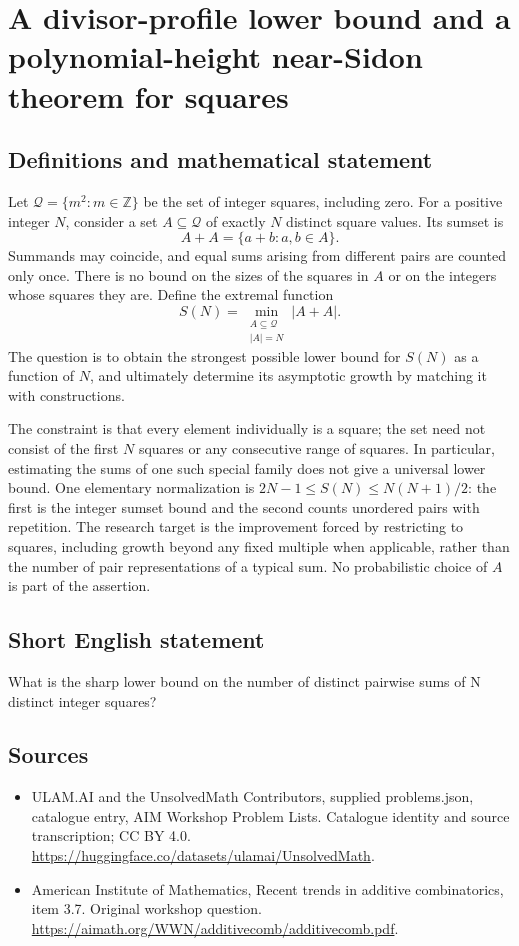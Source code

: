 \documentclass[11pt,a4paper]{article}
\begin{document}
\section*{A divisor-profile lower bound and a polynomial-height near-Sidon theorem for squares}\label{statement}

\subsection{Definitions and mathematical statement}
Let $\mathcal Q=\{m^2:m\in\mathbb Z\}$ be the set of integer
squares, including zero. For a positive integer $N$, consider a set
$A\subseteq\mathcal Q$ of exactly $N$ distinct square values.
Its sumset is
\[
                         A+A=\{a+b:a,b\in A\}.
\]
Summands may coincide, and equal sums arising from different pairs
are counted only once. There is no bound on the sizes of the squares
in $A$ or on the integers whose squares they are.
Define the extremal function
\[
                         S(N)=\min_{\substack{A\subseteq\mathcal Q\\|A|=N}}
                                      |A+A|.
\]
The question is to obtain the strongest possible lower bound for
$S(N)$ as a function of $N$, and ultimately determine its asymptotic
growth by matching it with constructions.

The constraint is that every element individually is a square; the
set need not consist of the first $N$ squares or any consecutive
range of squares. In particular, estimating the sums of one such
special family does not give a universal lower bound.
One elementary normalization is $2N-1\le S(N)\le N(N+1)/2$:
the first is the integer sumset bound and the second counts unordered
pairs with repetition. The research target is the improvement forced
by restricting to squares, including growth beyond any fixed
multiple when applicable, rather than the number of pair
representations of a typical sum. No probabilistic choice of $A$
is part of the assertion.
\subsection{Short English statement}
What is the sharp lower bound on the number of distinct pairwise sums of N distinct integer squares?
\subsection{Sources}
\begin{itemize}
\item[S1] ULAM.AI and the UnsolvedMath Contributors, supplied problems.json, catalogue entry, AIM Workshop Problem Lists. Catalogue identity and source transcription; CC BY 4.0.
\url{https://huggingface.co/datasets/ulamai/UnsolvedMath}.
\item[S2] American Institute of Mathematics, Recent trends in additive combinatorics, item 3.7. Original workshop question.
\url{https://aimath.org/WWN/additivecomb/additivecomb.pdf}.
\end{itemize}
\end{document}
